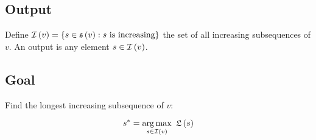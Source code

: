 \subsection{Output}

Define $\mathcal{I}\left(v\right) = \left\{  s \in \mathfrak{s}\left(v\right) : s \mbox{ is increasing} \right\}$ the set of all increasing subsequences of $v$. An output is any element $s \in \mathcal{I}\left(v\right)$.

\subsection{Goal}

Find the longest increasing subsequence of $v$:

\begin{equation}
    s^* = \operatorname*{arg\,max}\limits_{s \in \mathcal{I}\left(v\right)} \ \mathfrak{L}\left(s\right)
\end{equation}
